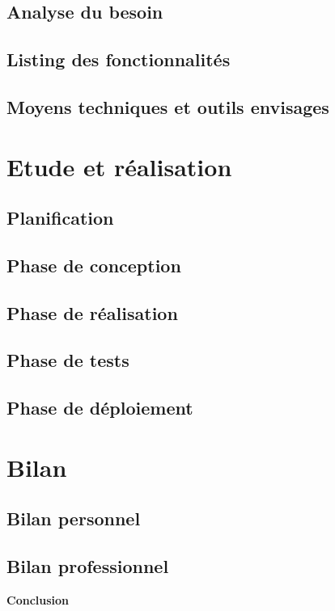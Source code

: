 \documentclass[a4paper]{article}
\begin{document}
    \subsection{Analyse du besoin}
    \subsection{Listing des fonctionnalités}
    \subsection{Moyens techniques et outils envisages}

    \section{Etude et réalisation}
    \subsection{Planification}
    \subsection{Phase de conception}
    \subsection{Phase de réalisation}
    \subsection{Phase de tests}
    \subsection{Phase de déploiement}
   
    \section{Bilan}
    \subsection{Bilan personnel}
    \subsection{Bilan professionnel}

    \huge \textbf{Conclusion} \vspace{5pt} \\
   
\end{document}
